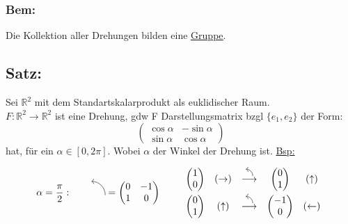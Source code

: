 \documentclass[titlepage,12pt,a4paper,ngerman]{report}
\begin{document}
\subsubsection{Bem:}
Die Kollektion aller Drehungen bilden eine \underline{\underline{Gruppe}}.

\subsection{Satz:}
Sei $ \mathbb{R}^2 $ mit dem Standartskalarprodukt als euklidischer Raum.\\
$F: \mathbb{R}^2 \to \mathbb{R}^2$ ist eine Drehung, gdw F Darstellungsmatrix bzgl $ \{e_1,e_2\} $ der Form:
$$\begin{pmatrix}
\cos \alpha & - \sin \alpha \\
\sin \alpha & \cos \alpha
\end{pmatrix}$$
hat, für ein $ \alpha \in [0, 2\pi] $. Wobei $ \alpha $ der Winkel der Drehung ist.
\underline{Bsp:}

$$ \alpha = \frac{\pi}{2} :\qquad \begin{tikzpicture}
\draw[->] (0,0) to [out=90,in=0] (-.5,.5);
\end{tikzpicture} = \begin{pmatrix}
0 & -1\\
1 & 0
\end{pmatrix}\qquad 
\begin{array}{ccccc}
\begin{pmatrix}
1\\0
\end{pmatrix}& (\rightarrow) & \buildrel \begin{tikzpicture}
\draw[->] (0,0) to [out=90,in=0] (-.25,.25);
\end{tikzpicture} \over \longrightarrow & \begin{pmatrix}
0\\1
\end{pmatrix}& (\uparrow)\\[10pt]
\begin{pmatrix}
0\\1
\end{pmatrix}& (\uparrow) & \buildrel \begin{tikzpicture}
\draw[->] (0,0) to [out=90,in=0] (-.25,.25);
\end{tikzpicture} \over \longrightarrow & \begin{pmatrix}
-1\\0
\end{pmatrix}& (\leftarrow)
\end{array}$$










	 
\end{document}
